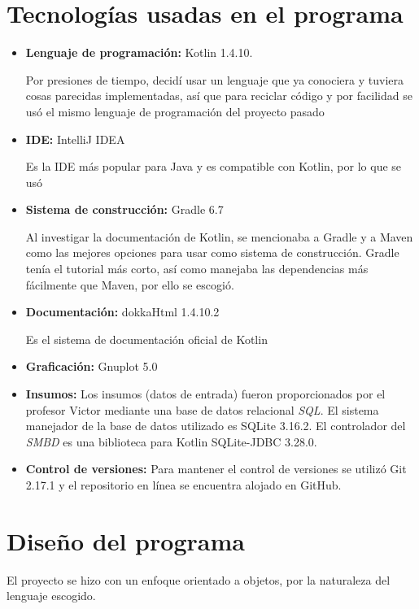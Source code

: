 \documentclass{article}
\begin{document}
\section{Tecnologías usadas en el programa}
\begin{itemize}
	\item{ \textbf{Lenguaje de programación:} Kotlin 1.4.10. 
		
		Por presiones de tiempo, decidí usar un lenguaje que ya conociera y tuviera cosas parecidas implementadas, así que para reciclar código y por facilidad se usó el mismo lenguaje de programación del proyecto pasado}
	\item {\textbf{IDE:} IntelliJ IDEA
		
		Es la IDE más popular para Java y es compatible con Kotlin, por lo que se usó}
	\item {\textbf{Sistema de construcción:} Gradle 6.7
		
		Al investigar la documentación de Kotlin, se mencionaba a Gradle y a Maven como las mejores opciones para usar como sistema de construcción. Gradle tenía el tutorial más corto, así como manejaba las dependencias más fácilmente que Maven, por ello se escogió.
	}
	\item {\textbf{Documentación:} dokkaHtml 1.4.10.2  
		
		Es el sistema de documentación oficial de Kotlin}
	\item {\textbf{Graficación:} Gnuplot 5.0}
	\item {\textbf{Insumos:} Los insumos (datos de entrada) fueron proporcionados por el profesor Victor mediante una base de datos relacional \textit{SQL}. El sistema manejador de la base de datos utilizado es SQLite 3.16.2. El controlador del \textit{SMBD} es una biblioteca para Kotlin SQLite-JDBC 3.28.0.}
	\item {\textbf{Control de versiones:} Para mantener el control de versiones se utilizó Git 2.17.1 y el repositorio en línea se encuentra alojado en GitHub.}
\end{itemize}

\section{Diseño del programa}


El proyecto se hizo con un enfoque orientado a objetos, por la naturaleza del lenguaje escogido. 
\end{document}
